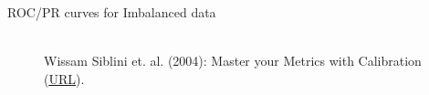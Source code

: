\documentclass[11pt,compress,t,notes=noshow, xcolor=table]{beamer}
\begin{document}
\begin{vbframe}{ROC/PR curves for Imbalanced data}
		\begin{figure}
			\centering
			\tiny
			\\ Wissam Siblini et. al. (2004): Master your Metrics with Calibration
			(\href{https://arxiv.org/pdf/1909.02827.pdf}{\underline{URL}}).
		\end{figure}
		
		
	\end{vbframe}
\end{document}
